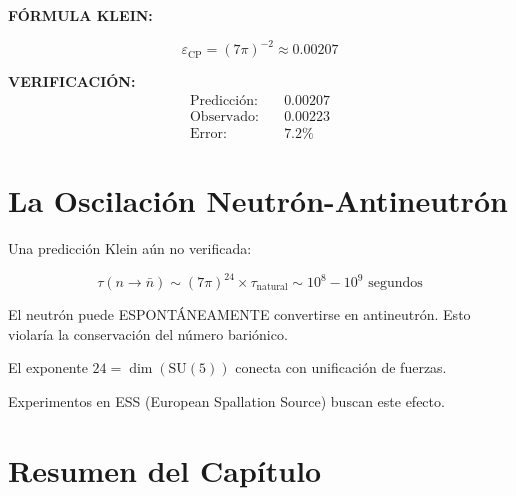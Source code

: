 \begin{nivelmatematico}
\textbf{FÓRMULA KLEIN:}

\begin{equation}
\boxed{\varepsilon_{\text{CP}} = (7\pi)^{-2} \approx 0.00207}
\end{equation}

\textbf{VERIFICACIÓN:}
\begin{align}
\text{Predicción:} & \quad 0.00207\\
\text{Observado:} & \quad 0.00223\\
\text{Error:} & \quad 7.2\%
\end{align}
\end{nivelmatematico}


\section{La Oscilación Neutrón-Antineutrón}

Una predicción Klein aún no verificada:

\begin{equation}
\tau(n \to \bar{n}) \sim (7\pi)^{24} \times \tau_{\text{natural}} \sim 10^8 - 10^9 \text{ segundos}
\end{equation}

El neutrón puede ESPONTÁNEAMENTE convertirse en antineutrón.
Esto violaría la conservación del número bariónico.

El exponente $24 = \dim(\text{SU}(5))$ conecta con unificación de fuerzas.

Experimentos en ESS (European Spallation Source) buscan este efecto.


\section{Resumen del Capítulo}

